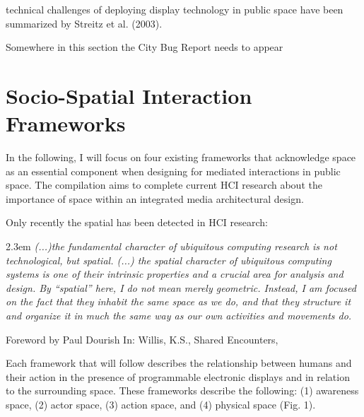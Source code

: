 technical challenges of deploying display
technology in public space have been summarized by Streitz et al. (2003).

Somewhere in this section the City Bug Report needs to appear



\section{Socio-Spatial Interaction Frameworks}

In the following, I will focus on four existing frameworks that acknowledge space as an essential component when designing for mediated interactions in public space. The compilation aims to complete current HCI research about the importance of space within an integrated media architectural design. 

Only recently the spatial has been detected in HCI research:

\begin{singlespace}
	\leftskip2.3em
		\rightskip\leftskip
\textit{\small (...)the fundamental character of ubiquitous computing research is not technological, but spatial. (...) the spatial character of ubiquitous computing systems is one of their intrinsic properties and a crucial area for analysis and design. 
By “spatial” here, I do not mean merely geometric. 
Instead, I am focused on the fact that they inhabit the same space as we do, and that they structure it and organize it in much the same way as our own activities and movements do.} 

\small Foreword by Paul Dourish In: Willis, K.S., Shared Encounters,
\end{singlespace}



Each framework that will follow describes the relationship between humans and their action in the presence of programmable electronic displays and in relation to the surrounding space.
These frameworks describe the following: (1) awareness space, (2) actor space, (3) action space, and (4) physical space (Fig. 1).


